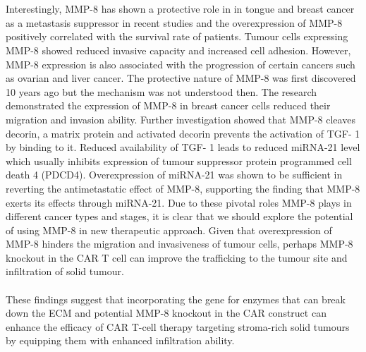 \documentclass[12pt,oneside]{report}
\begin{document}
\\\\Interestingly, MMP-8 has shown a protective role in in tongue and breast cancer as a metastasis suppressor in recent studies and the overexpression of MMP-8 positively correlated with the survival rate of patients\citep{MMP8, MMP8-2, MMP8-3}. Tumour cells expressing MMP-8 showed reduced invasive capacity and increased cell adhesion\citep{MMP8-4}. However, MMP-8 expression is also associated with the progression of certain cancers such as ovarian\citep{MMP8-5} and liver cancer\citep{MMP8-6}. The protective nature of MMP-8 was first discovered 10 years ago\citep{MMP8, MMP8-2} but the mechanism was not understood then. The research demonstrated the expression of MMP-8 in breast cancer cells reduced their migration and invasion ability\citep{MMP8-8}. Further investigation showed that MMP-8 cleaves decorin\citep{MMP8-8}, a matrix protein and activated decorin prevents the activation of TGF-\textbeta{} 1 by binding to it. Reduced availability of TGF-\textbeta{} 1 leads to reduced miRNA-21 level\citep{MMP8-8} which usually inhibits expression of tumour suppressor protein programmed cell death 4 (PDCD4). Overexpression of miRNA-21 was shown to be sufficient in reverting the antimetastatic effect of MMP-8\citep{MMP8-8}, supporting the finding that MMP-8 exerts its effects through miRNA-21. Due to these pivotal roles MMP-8 plays in different cancer types and stages\citep{MMP8-7}, it is clear that we should explore the potential of using MMP-8 in new therapeutic approach. Given that overexpression of MMP-8 hinders the migration and invasiveness of tumour cells, perhaps MMP-8 knockout in the CAR T cell can improve the trafficking to the tumour site and infiltration of solid tumour. 
\\\\These findings suggest that incorporating the gene for enzymes that can break down the ECM and potential MMP-8 knockout in the CAR construct can enhance the efficacy of CAR T-cell therapy targeting stroma-rich solid tumours by equipping them with enhanced infiltration ability.
\end{document}
